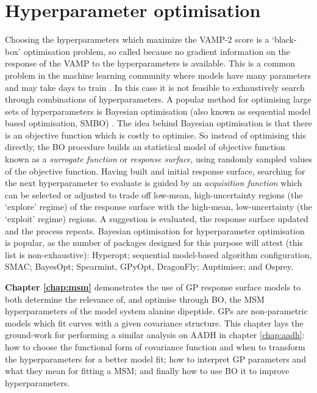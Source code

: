 \section{Hyperparameter optimisation}\label{sec:intro_hyper_opt}
Choosing the hyperparameters which maximize the VAMP-2 score is a `black-box' optimisation problem\cite{jonesEfficientGlobalOptimization1998a}, so called because no gradient information on the response of the VAMP to the hyperparameters is available. This is a common problem in the machine learning community where models have many parameters and may take days to train \cite{feurer2019hyperparameter}. In this case it is not feasible to exhaustively search through combinations of hyperparameters. A popular method for optimising large sets of hyperparameters is Bayesian optimisation (also known as sequential model based optimisation, SMBO) \cite{hutterSequentialModelbasedOptimization2011,NIPS2012_4522,bergstraAlgorithmsHyperParameterOptimizationa,bergstraMakingScienceModel2013}. The idea behind Bayesian optimisation is that there is an objective function which is costly to optimise\cite{brochuTutorialBayesianOptimization2010,shahriariTakingHumanOut2016}. So instead of optimising this directly, the BO procedure builds an statistical model of  objective function known as a \emph{surrogate function} or \emph{response surface}, using randomly sampled  values of the objective function. Having built and initial response surface, searching for the next hyperparameter to evaluate is guided by an \emph{acquisition function} which can be selected or adjusted to trade off low-mean, high-uncertainty regions (the `explore' regime) of the response surface with the high-mean, low-uncertainty (the `exploit' regime) regions. A suggestion is evaluated, the response surface updated and the process repeats. Bayesian optimisation for hyperparameter optimisation is popular, as the number of packages designed for this purpose will attest (this list is non-exhaustive): Hyperopt\cite{bergstraHyperoptPythonLibrary2013}; sequential model-based algorithm configuration\cite{hutterSequentialModelbasedOptimization2011}, SMAC; BayesOpt\cite{martinez-cantinBayesOptBayesianOptimization2014}; Spearmint\cite{DBLP:conf/uai/GelbartSA14,snoekAbstractBayesianOptimization2013,snoekInputWarpingBayesian2014a,NIPS2013_5086,NIPS2012_4522}, GPyOpt\cite{gpyopt2016}, DragonFly\cite{JMLR:v21:18-223}; Auptimiser\cite{liuAuptimizerExtensibleOpenSource2019}; and Osprey\cite{mcgibbonOspreyHyperparameterOptimization2016a}.  

\textbf{Chapter \ref{chap:msm}} demonstrates the use of GP response surface models to both determine the relevance of, and optimise through BO, the MSM hyperparameters of the model system alanine dipeptide. GPs are non-parametric models which fit curves with a given covariance structure\cite{rasmussenGaussianProcessesMachine2006}. This chapter lays the ground-work for performing a similar analysis on AADH in chapter \ref{chap:aadh}: how to choose the functional form of covariance function and when to transform the hyperparameters for a better model fit; how to interpret GP parameters and what they mean for fitting a MSM; and finally how to use BO it to improve hyperparameters. 

